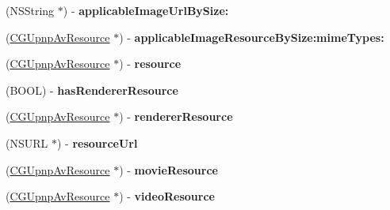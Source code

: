 \begin{DoxyCompactItemize}
\item 
\hypertarget{interface_c_g_upnp_av_item_a211d687eec6cb79da6e696540942b125}{(N\-S\-String $\ast$) -\/ {\bfseries applicable\-Image\-Url\-By\-Size\-:}}\label{interface_c_g_upnp_av_item_a211d687eec6cb79da6e696540942b125}

\item 
\hypertarget{interface_c_g_upnp_av_item_ae3936a2350f575b5295e6ed931da9e4f}{(\hyperlink{interface_c_g_upnp_av_resource}{C\-G\-Upnp\-Av\-Resource} $\ast$) -\/ {\bfseries applicable\-Image\-Resource\-By\-Size\-:mime\-Types\-:}}\label{interface_c_g_upnp_av_item_ae3936a2350f575b5295e6ed931da9e4f}

\item 
\hypertarget{interface_c_g_upnp_av_item_ab83ab93d40452ed1b67333caae37c3a3}{(\hyperlink{interface_c_g_upnp_av_resource}{C\-G\-Upnp\-Av\-Resource} $\ast$) -\/ {\bfseries resource}}\label{interface_c_g_upnp_av_item_ab83ab93d40452ed1b67333caae37c3a3}

\item 
\hypertarget{interface_c_g_upnp_av_item_aefa6bd31bb15f45dba85cd13423e9c1f}{(B\-O\-O\-L) -\/ {\bfseries has\-Renderer\-Resource}}\label{interface_c_g_upnp_av_item_aefa6bd31bb15f45dba85cd13423e9c1f}

\item 
\hypertarget{interface_c_g_upnp_av_item_aaff37e10f679fc78dbdaa6f9172cb5f4}{(\hyperlink{interface_c_g_upnp_av_resource}{C\-G\-Upnp\-Av\-Resource} $\ast$) -\/ {\bfseries renderer\-Resource}}\label{interface_c_g_upnp_av_item_aaff37e10f679fc78dbdaa6f9172cb5f4}

\item 
\hypertarget{interface_c_g_upnp_av_item_ad82fe656a5143194ea12b1f24b16afbe}{(N\-S\-U\-R\-L $\ast$) -\/ {\bfseries resource\-Url}}\label{interface_c_g_upnp_av_item_ad82fe656a5143194ea12b1f24b16afbe}

\item 
\hypertarget{interface_c_g_upnp_av_item_af9c350a6ad68d686a6e144f967a56e70}{(\hyperlink{interface_c_g_upnp_av_resource}{C\-G\-Upnp\-Av\-Resource} $\ast$) -\/ {\bfseries movie\-Resource}}\label{interface_c_g_upnp_av_item_af9c350a6ad68d686a6e144f967a56e70}

\item 
\hypertarget{interface_c_g_upnp_av_item_a2849861eb9ee2738c2e5c8c46307a96f}{(\hyperlink{interface_c_g_upnp_av_resource}{C\-G\-Upnp\-Av\-Resource} $\ast$) -\/ {\bfseries video\-Resource}}\label{interface_c_g_upnp_av_item_a2849861eb9ee2738c2e5c8c46307a96f}


\end{DoxyCompactItemize}
